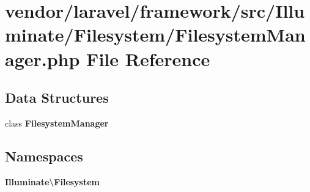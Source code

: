 \section{vendor/laravel/framework/src/\+Illuminate/\+Filesystem/\+Filesystem\+Manager.php File Reference}
\label{_filesystem_manager_8php}
\subsection*{Data Structures}
\begin{DoxyCompactItemize}
\item 
class {\bf Filesystem\+Manager}
\end{DoxyCompactItemize}
\subsection*{Namespaces}
\begin{DoxyCompactItemize}
\item 
 {\bf Illuminate\textbackslash{}\+Filesystem}
\end{DoxyCompactItemize}
